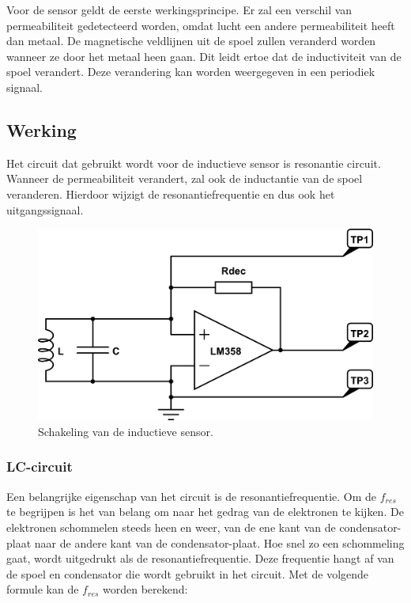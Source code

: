 \documentclass{report}
\begin{document}
Voor de sensor geldt de eerste werkingsprincipe. Er zal een verschil van permeabiliteit gedetecteerd worden, omdat lucht een andere permeabiliteit heeft dan metaal. De magnetische veldlijnen uit de spoel zullen veranderd worden wanneer ze door het metaal heen gaan. Dit leidt ertoe dat de inductiviteit van de spoel verandert. Deze verandering kan worden weergegeven in een periodiek signaal.

\newpage
\subsection{Werking}

Het circuit dat gebruikt wordt voor de inductieve sensor is resonantie circuit. Wanneer de permeabiliteit verandert, zal ook de inductantie van de spoel veranderen. Hierdoor wijzigt de resonantiefrequentie en dus ook het uitgangssignaal.

\begin{figure}[H]
\centering
\includegraphics[scale=0.45]{inductieve_sensor.png}
\caption{Schakeling van de inductieve sensor.}
\label{fig:schakeling_sensor}
\end{figure}

\subsubsection{LC-circuit}
Een belangrijke eigenschap van het circuit is de resonantiefrequentie. Om de $f_{res}$ te begrijpen is het van belang om naar het gedrag van de elektronen te kijken. De elektronen schommelen steeds heen en weer, van de ene kant van de condensator-plaat naar de andere kant van de condensator-plaat. Hoe snel zo een schommeling gaat, wordt uitgedrukt als de resonantiefrequentie. Deze frequentie hangt af van de spoel en condensator die wordt gebruikt in het circuit. Met de volgende formule kan de $f_{res}$ worden berekend:
\end{document}

